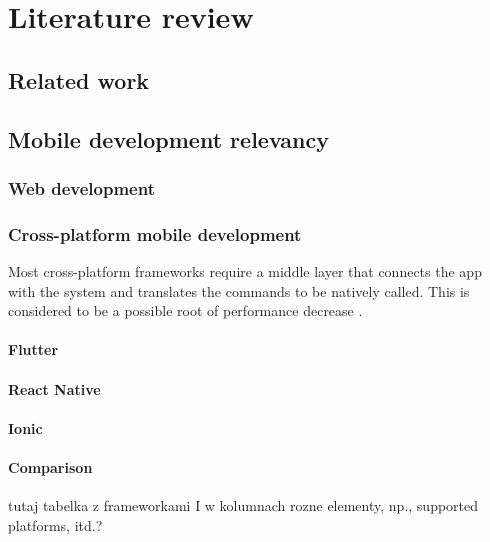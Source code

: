 
\chapter{Literature review}

\section{Related work}

\section{Mobile development relevancy}



\subsection{Web development}

\subsection{Cross-platform mobile development}

Most cross-platform frameworks require a middle layer that connects the app with the system and translates the commands to be natively called. This is considered to be a possible root of performance decrease \cite{appdynamics_mobile_app_performance}.

\subsubsection{Flutter}
\subsubsection{React Native}
\subsubsection{Ionic}
\subsubsection{Comparison}
tutaj tabelka z frameworkami I w kolumnach rozne elementy, np., supported platforms, itd.?

